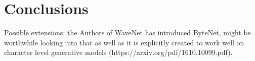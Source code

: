 \chapter{Conclusions}
\label{ConclusionsCh}

Possible extensions: the Authors of WaveNet has introduced ByteNet, might be
worthwhile looking into that as well as it is explicitly created to work well on
character level generative models (https://arxiv.org/pdf/1610.10099.pdf).
